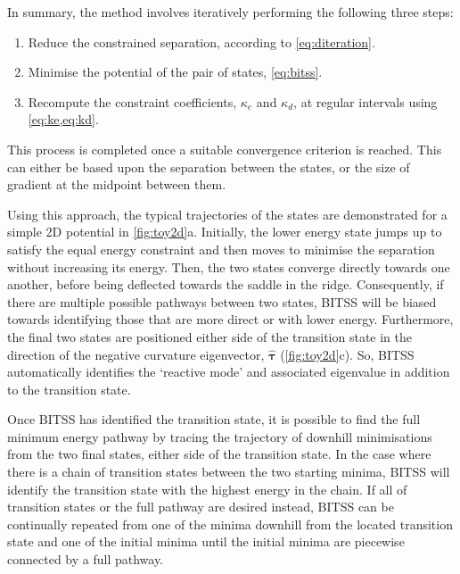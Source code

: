 \documentclass[twocolumn,10pt]{revtex4}
\begin{document}
In summary, the method involves iteratively performing the following three steps:
\begin{enumerate}
  \item Reduce the constrained separation, according to \cref{eq:diteration}.
  \item Minimise the potential of the pair of states, \cref{eq:bitss}.
  \item Recompute the constraint coefficients, $\kappa_e$ and $\kappa_d$, at regular intervals using \cref{eq:ke,eq:kd}.
\end{enumerate}
This process is completed once a suitable convergence criterion is reached.
This can either be based upon the separation between the states, or the size of gradient at the midpoint between them.

Using this approach, the typical trajectories of the states are demonstrated for a simple 2D potential in \cref{fig:toy2d}a.
Initially, the lower energy state jumps up to satisfy the equal energy constraint and then moves to minimise the separation without increasing its energy.
Then, the two states converge directly towards one another, before being deflected towards the saddle in the ridge.
Consequently, if there are multiple possible pathways between two states, BITSS will be biased towards identifying those that are more direct or with lower energy.
Furthermore, the final two states are positioned either side of the transition state in the direction of the negative curvature eigenvector, $\bm{\hat{\tau}}$ (\cref{fig:toy2d}c).
So, BITSS automatically identifies the `reactive mode' and associated eigenvalue in addition to the transition state.

Once BITSS has identified the transition state, it is possible to find the full minimum energy pathway by tracing the trajectory of downhill minimisations from the two final states, either side of the transition state.
In the case where there is a chain of transition states between the two starting minima, BITSS will identify the transition state with the highest energy in the chain.
If all of transition states or the full pathway are desired instead, BITSS can be continually repeated from one of the minima downhill from the located transition state and one of the initial minima until the initial minima are piecewise connected by a full pathway.
\end{document}
